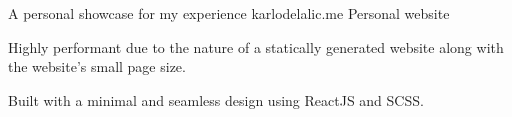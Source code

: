 \begin{cventries}

\cventry
{A personal showcase for my experience} %
{karlodelalic.me \href{https://github.com/kdelalic/karlodelalic.com-gatsby}{\faGithub}} %
{Personal website}
{}
{ %
\begin{cvitems}
\item {Highly performant due to the nature of a statically generated website along with the website's small page size.}
\item {Built with a minimal and seamless design using ReactJS and SCSS.}
\end{cvitems}
}


\end{cventries}